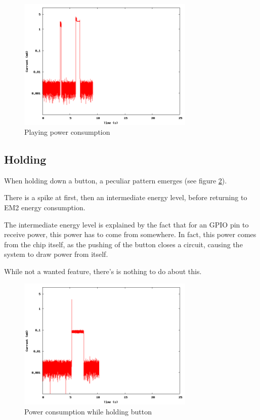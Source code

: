 \begin{figure}[H]
\centering
\includegraphics[width=0.75\textwidth]{data/play.png}
\caption{Playing power consumption}
\label{fig:playpower}
\end{figure}

\subsection{Holding}
When holding down a button, a peculiar pattern emerges (see figure \ref{fig:holdingpower}). 

There is a spike at first, then an intermediate energy level, before returning to EM2 energy consumption.

The intermediate energy level is explained by the fact that for an GPIO pin to receive power, this power has to come from somewhere. In fact, this power comes from the chip itself, as the pushing of the button closes a circuit, causing the system to draw power from itself.

While not a wanted feature, there's is nothing to do about this.

\begin{figure}[H]
\centering
\includegraphics[width=0.75\textwidth]{data/hold.png}
\caption{Power consumption while holding button}
\label{fig:holdingpower}
\end{figure}
